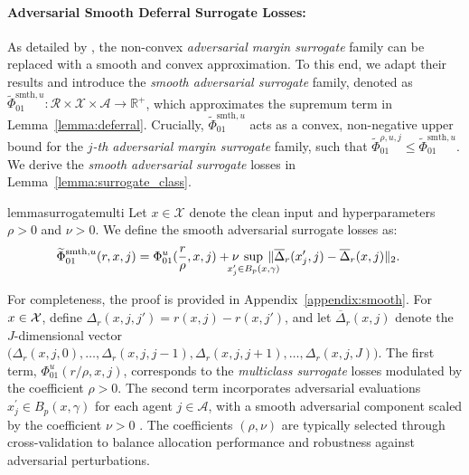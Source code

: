 \paragraph{Adversarial Smooth Deferral Surrogate Losses:}  
As detailed by \citet{Grounded, mao2023crossentropylossfunctionstheoretical}, the non-convex \emph{adversarial margin surrogate} family can be replaced with a smooth and convex approximation. To this end, we adapt their results and introduce the \emph{smooth adversarial surrogate} family, denoted as \( \widetilde{\Phi}^{\text{smth},u}_{01}: \mathcal{R} \times \mathcal{X} \times \mathcal{A} \to \mathbb{R}^+ \), which approximates the supremum term in Lemma~\ref{lemma:deferral}. Crucially, \( \widetilde{\Phi}^{\text{smth},u}_{01} \) acts as a convex, non-negative upper bound for the \emph{$j$-th adversarial margin surrogate} family, such that \( \widetilde{\Phi}_{01}^{\rho,u,j} \leq \widetilde{\Phi}_{01}^{\text{smth}, u} \). We derive the \emph{smooth adversarial surrogate} losses in Lemma~\ref{lemma:surrogate_class}.
\begin{restatable}{lemma}{surrogatemulti} \label{lemma:surrogate_class}
Let \( x \in \mathcal{X} \) denote the clean input and hyperparameters $\rho>0$ and $\nu>0$. We define the smooth adversarial  surrogate losses as:
    \begin{equation*}
    \begin{aligned}
        \widetilde{\Phi}_{01}^{\text{smth}, u} (r,x,j) = \Phi_{01}^u& (\frac{r}{\rho},x,j) + \nu \mspace{-20mu} \sup_{x_j^\prime \in B_p(x,\gamma)}\mspace{-20mu}  \| \overline{\Delta}_r(x_j', j) - \overline{\Delta}_r(x, j)\|_2.
        \end{aligned}
    \end{equation*}
\end{restatable}
For completeness, the proof is provided in Appendix~\ref{appendix:smooth}. For \( x\in\mathcal{X} \), define \( \Delta_r(x, j, j') = r(x, j) - r(x, j') \), and let \( \overline{\Delta}_r(x, j) \) denote the $J$-dimensional vector $\big( \Delta_r(x, j, 0), \ldots, \Delta_r(x, j, j-1), \Delta_r(x, j, j+1), \ldots, \Delta_r(x, j, J) \big)$. The first term, \( \Phi_{01}^u(r / \rho, x, j) \), corresponds to the \textit{multiclass surrogate} losses modulated by the coefficient \( \rho > 0 \). The second term incorporates adversarial evaluations \( x_j^\prime \in B_p(x, \gamma) \) for each agent \( j \in \mathcal{A} \), with a smooth adversarial component scaled by the coefficient \( \nu > 0 \) \citep{Grounded, mao2023crossentropylossfunctionstheoretical}. The coefficients \( (\rho, \nu) \) are typically selected through cross-validation to balance allocation performance and robustness against adversarial perturbations.


